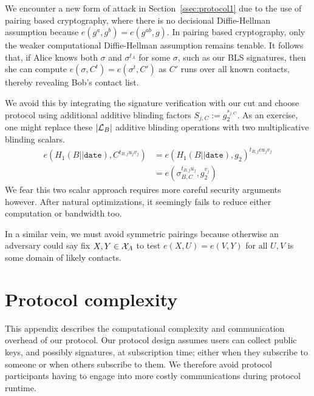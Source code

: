 \documentclass{article}
\begin{document}
We encounter a new form of attack in Section~\ref{ssec:protocol1}
due to the use of pairing based cryptography, where
there is no decisional Diffie-Hellman assumption because
$e(g^a,g^b) = e(g^{ab},g)$.  In pairing based cryptography, only the
weaker computational Diffie-Hellman assumption remains tenable.
It follows that, if Alice knows both $\sigma$ and
 $\sigma^{t_A}$ for some $\sigma$, such as our BLS signatures,
then she can compute $e(\sigma,C^t) = e(\sigma^t,C')$ as
 $C'$ runs over all known contacts,
thereby revealing Bob's contact list.

We avoid this by integrating the signature verification with our
cut and choose protocol using additional additive blinding factors
$S_{j,C} := g_2^{s_{j,C}}$.
As an exercise, one might replace these $|{\cal L}_B|$ additive
blinding operations with two multiplicative blinding scalars.
\begin{align*}
e( H_1(B||\texttt{date}), C^{t_{B,j} u_j v_j} )
 &= e( H_1(B||\texttt{date}), g_2 )^{t_{B,j} c u_j v_j} \\
 &= e( \sigma_{B,C}^{t_{B,j} u_j}, g_2^{v_j} )
\end{align*}
We fear this two scalar approach requires more careful security
arguments however.
After natural optimizations, it seemingly fails to reduce either
computation or bandwidth too.


In a similar vein, we must avoid symmetric pairings because otherwise
an adversary could say fix $X,Y \in {\cal X}_A$ to test
$e(X,U) = e(V,Y)$ for all $U,V$ is some domain of likely contacts.

\section{Protocol complexity}
%
This appendix describes the computational complexity and
communication overhead of our protocol. Our protocol
design assumes users can collect public keys, and possibly signatures, at
subscription time; either when they subscribe to someone or when
others subscribe to them. We therefore avoid protocol participants
having to engage into more costly communications during protocol
runtime.
\end{document}

